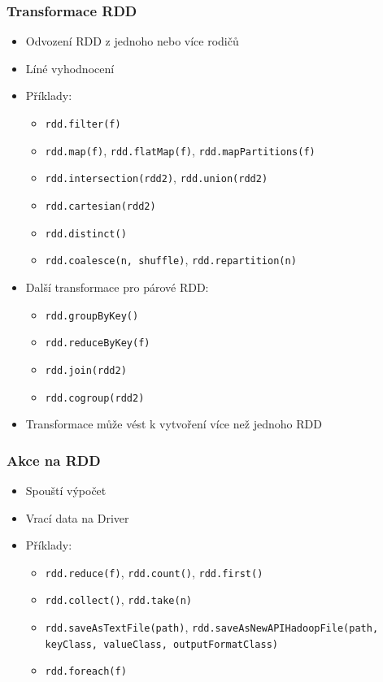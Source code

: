 \documentclass[xcolor=dvipsnames,compact]{beamer}
\newcommand\tab[1][1cm]{\hspace*{#1}}
\begin{document}
\begin{frame}[fragile]
	\frametitle{Transformace RDD}
	\begin{itemize}
		\item Odvození RDD z jednoho nebo více rodičů
		\item Líné vyhodnocení
		\item Příklady:
		\begin{itemize}
			\item \verb|rdd.filter(f)|
			\item \verb|rdd.map(f)|, \verb|rdd.flatMap(f)|, \verb|rdd.mapPartitions(f)|
			\item \verb|rdd.intersection(rdd2)|, \verb|rdd.union(rdd2)|
			\item \verb|rdd.cartesian(rdd2)|
			\item \verb|rdd.distinct()|
			\item \verb|rdd.coalesce(n, shuffle)|, \verb|rdd.repartition(n)|
		\end{itemize}
		\item Další transformace pro párové RDD:
		\begin{itemize}
			\item \verb|rdd.groupByKey()|
			\item \verb|rdd.reduceByKey(f)|
			\item \verb|rdd.join(rdd2)|
			\item \verb|rdd.cogroup(rdd2)|
		\end{itemize}
		\item Transformace může vést k vytvoření více než jednoho RDD
	\end{itemize}
\end{frame}

\begin{frame}[fragile]
	\frametitle{Akce na RDD} 
	\begin{itemize}
		\item Spouští výpočet
		\item Vrací data na Driver
		\item Příklady:
		\begin{itemize}
			\item \verb|rdd.reduce(f)|, \verb|rdd.count()|, \verb|rdd.first()|
			\item \verb|rdd.collect()|, \verb|rdd.take(n)|
			\item \verb|rdd.saveAsTextFile(path)|, \verb|rdd.saveAsNewAPIHadoopFile(path, | \\
				\tab \verb|keyClass, valueClass, outputFormatClass)|
			\item \verb|rdd.foreach(f)|
		\end{itemize}
	\end{itemize}
\end{frame}
\end{document}
